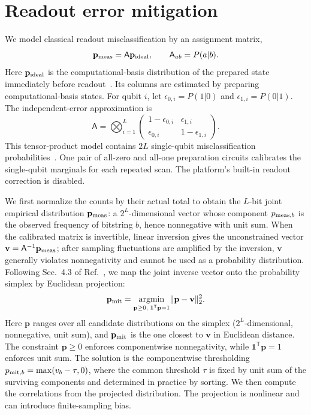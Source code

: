 \section{Readout error mitigation}
\label{sec:readout}

We model classical readout misclassification by an assignment matrix,
\begin{equation}
\mathbf p_{\rm meas}=\mathsf A\mathbf p_{\rm ideal},
\qquad \mathsf A_{ab}=P(a|b).
\label{eq:assignment}
\end{equation}
Here $\mathbf p_{\rm ideal}$ is the computational-basis distribution of the prepared state immediately before readout~\cite{cai2023quantum}.
Its columns are estimated by preparing computational-basis states.
For qubit $i$, let $\epsilon_{0,i}=P(1|0)$ and $\epsilon_{1,i}=P(0|1)$.
The independent-error approximation is
\begin{equation}
\mathsf A=\bigotimes_{i=1}^L
\begin{pmatrix}
1-\epsilon_{0,i}&\epsilon_{1,i}\\
\epsilon_{0,i}&1-\epsilon_{1,i}
\end{pmatrix}.
\label{eq:tensor-readout}
\end{equation}
This tensor-product model contains $2L$ single-qubit misclassification probabilities~\cite{bravyi2021mitigating}.
One pair of all-zero and all-one preparation circuits calibrates the single-qubit marginals for each repeated scan.
The platform's built-in readout correction is disabled.

We first normalize the counts by their actual total to obtain the $L$-bit joint empirical distribution $\mathbf p_{\rm meas}$: a $2^L$-dimensional vector whose component $p_{{\rm meas},b}$ is the observed frequency of bitstring $b$, hence nonnegative with unit sum. When the calibrated matrix is invertible, linear inversion gives the unconstrained vector $\mathbf v=\mathsf A^{-1}\mathbf p_{\rm meas}$; after sampling fluctuations are amplified by the inversion, $\mathbf v$ generally violates nonnegativity and cannot be used as a probability distribution. Following Sec.~4.3 of Ref.~\cite{maciejewski2020mitigation}, we map the joint inverse vector onto the probability simplex by Euclidean projection:
\begin{equation}
\mathbf p_{\rm mit}
=\underset{\mathbf p\ge0,\;\mathbf 1^{\mathsf T}\mathbf p=1}
{\operatorname{argmin}}\lVert\mathbf p-\mathbf v\rVert_2^2.
\label{eq:readout-projection}
\end{equation}
Here $\mathbf p$ ranges over all candidate distributions on the simplex ($2^L$-dimensional, nonnegative, unit sum), and $\mathbf p_{\rm mit}$ is the one closest to $\mathbf v$ in Euclidean distance. The constraint $\mathbf p\ge0$ enforces componentwise nonnegativity, while $\mathbf 1^{\mathsf T}\mathbf p=1$ enforces unit sum. The solution is the componentwise thresholding $p_{{\rm mit},b}=\max(v_b-\tau,0)$, where the common threshold $\tau$ is fixed by unit sum of the surviving components and determined in practice by sorting. We then compute the correlations from the projected distribution. The projection is nonlinear and can introduce finite-sampling bias.


